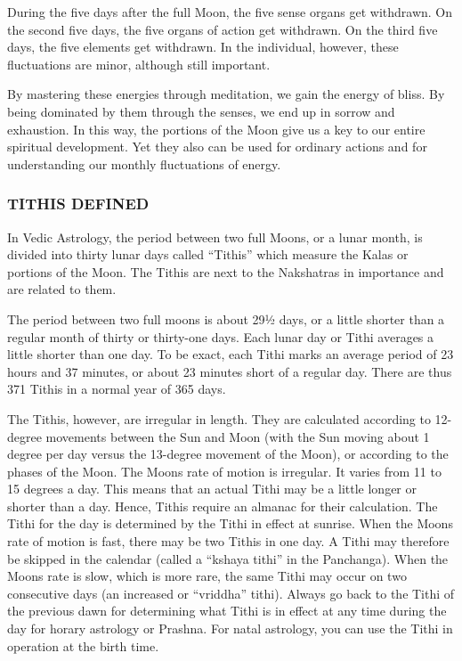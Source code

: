  

During the five days after the full Moon, the five sense organs get withdrawn. On the second five days, the five organs of action get withdrawn. On the third five days, the five elements get withdrawn. In the individual, however, these fluctuations are minor, although still important.

 

By mastering these energies through meditation, we gain the energy of bliss. By being dominated by them through the senses, we end up in sorrow and exhaustion. In this way, the portions of the Moon give us a key to our entire spiritual development. Yet they also can be used for ordinary actions and for understanding our monthly fluctuations of energy.

 

\subsubsection{TITHIS DEFINED}

In Vedic Astrology, the period between two full Moons, or a lunar month, is divided into thirty lunar days called “Tithis” which measure the Kalas or portions of the Moon. The Tithis are next to the Nakshatras in importance and are related to them.

 

The period between two full moons is about 29½ days, or a little shorter than a regular month of thirty or thirty-one days. Each lunar day or Tithi averages a little shorter than one day. To be exact, each Tithi marks an average period of 23 hours and 37 minutes, or about 23 minutes short of a regular day. There are thus 371 Tithis in a normal year of 365 days.

 

The Tithis, however, are irregular in length. They are calculated according to 12- degree movements between the Sun and Moon (with the Sun moving about 1 degree per day versus the 13-degree movement of the Moon), or according to the phases of the Moon. The Moons rate of motion is irregular. It varies from 11 to 15 degrees a day. This means that an actual Tithi may be a little longer or shorter than a day. Hence, Tithis require an almanac for their calculation. The Tithi for the day is determined by the Tithi in effect at sunrise. When the Moons rate of motion is fast, there may be two Tithis in one day. A Tithi may therefore be skipped in the calendar (called a “kshaya tithi” in the Panchanga). When the Moons rate is slow, which is more rare, the same Tithi may occur on two consecutive days (an increased or “vriddha” tithi). Always go back to the Tithi of the previous dawn for determining what Tithi is in effect at any time during the day for horary astrology or Prashna. For natal astrology, you can use the Tithi in operation at the birth time.

